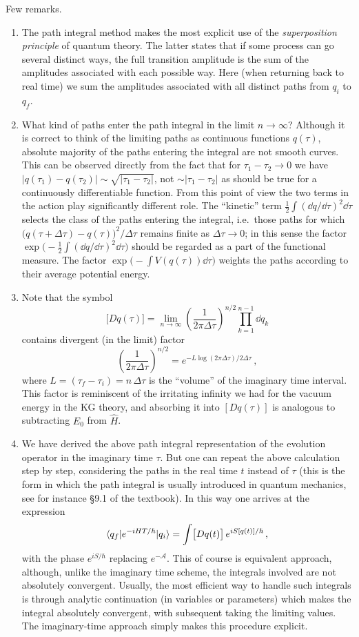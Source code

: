 Few remarks.
\begin{enumerate}
\item The path integral method makes the most explicit use of the
\emph{superposition principle} of quantum theory. The latter states that if
some process can go several distinct ways, the full transition amplitude is
the sum of the amplitudes associated with each possible way. Here (when
returning back to real time) we sum the amplitudes associated with all
distinct paths from $q_i$ to $q_f$.

\item What kind of paths enter the path integral in the limit $n\to\infty$?
Although it is correct to think of the limiting paths as continuous functions
$q(\tau)$, absolute majority of the paths entering the integral are not smooth
curves. This can be observed directly from the fact that for
$\tau_1-\tau_2\to0$ we have $|q(\tau_1)-q(\tau_2)|\sim\sqrt{|\tau_1-\tau_2|}$,
not $\sim|\tau_1-\tau_2|$ as should be true for a continuously differentiable
function. From this point of view the two terms in the action play
significantly different role. The ``kinetic'' term $\frac12\int(\dd q/\dd\tau)^2\dd\tau$
selects the class of the paths entering the integral, i.e.\ those paths for
which $\bigl(q(\tau+\Delta\tau)-q(\tau)\bigr)^2/\Delta\tau$ remains finite as
$\Delta\tau\to0$; in this sense the factor
$\exp\bigl(-\frac12\int(\dd q/\dd\tau)^2\dd\tau\bigr)$ should be regarded as a part
of the functional measure. The factor $\exp\bigl(-\int V(q(\tau))\dd\tau\bigr)$
weights the paths according to their average potential energy.

\item Note that the symbol
\[
\bigl[Dq(\tau)\bigr]=\lim_{n\to\infty}\left(\frac1{2\pi\Delta\tau}\right)^{n/2}\prod_{k=1}^{n-1}\dd q_k
\]
contains divergent (in the limit) factor
\[
\left(\frac1{2\pi\Delta\tau}\right)^{n/2}=e^{-L\log(2\pi\Delta\tau)/2\Delta\tau}\,,
\]
where $L=(\tau_f-\tau_i)=n\,\Delta\tau$ is the ``volume'' of the imaginary
time interval. This factor is reminiscent of the irritating infinity we had
for the vacuum energy in the KG theory, and absorbing it into $[Dq(\tau)]$ is
analogous to subtracting $E_0$ from $\hat H$.

\item We have derived the above path integral representation of the evolution
operator in the imaginary time $\tau$. But one can repeat the above
calculation step by step, considering the paths in the real time $t$ instead
of $\tau$ (this is the form in which the path integral is usually introduced
in quantum mechanics, see for instance \S9.1 of the textbook). In this way one
arrives at the expression
\[
\langle q_f|e^{-iHT/\hbar}|q_i\rangle=\int\bigl[Dq(t)\bigr]\,e^{iS[q(t)]/\hbar}\,,
\]
with the phase $e^{iS/\hbar}$ replacing $e^{-\mathcal A}$. This of
course is equivalent approach, although, unlike the imaginary time scheme, the
integrals involved are not absolutely convergent. Usually, the most efficient
way to handle such integrals is through analytic continuation (in variables or
parameters) which makes the integral absolutely convergent, with subsequent
taking the limiting values. The imaginary-time approach simply makes this
procedure explicit.


\end{enumerate}
